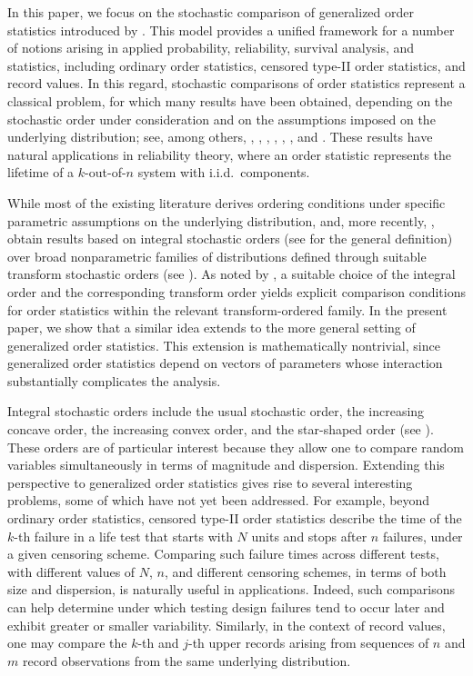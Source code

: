 \documentclass [11pt]{article}
\begin{document}
In this paper, we focus on the stochastic comparison of generalized order statistics introduced by \cite{Kamps1995}. This model provides a unified framework for a number of notions arising in applied probability, reliability, survival analysis, and statistics, including ordinary order statistics, censored type-II order statistics, and record values.
In this regard, stochastic comparisons of order statistics represent a classical problem, for which many results have been obtained, depending on the stochastic order under consideration and on the assumptions imposed on the underlying distribution; see, among others, \cite{ALO-JAP}, \cite{arnold1991exp}, \cite{kochar2006, kochar2012}, \cite{kochar2009}, \cite{kundu2016}, \cite{lando2021st}, and \cite{wilfling1996c}. These results have natural applications in reliability theory, where an order statistic represents the lifetime of a $k$-out-of-$n$ system with i.i.d.\ components.

While most of the existing literature derives ordering conditions under specific parametric assumptions on the underlying distribution, \cite{lando2021st} and, more recently, \cite{ALO-JAP}, obtain results based on integral stochastic orders (see \cite{muller1997} for the general definition) over broad nonparametric families of distributions defined through suitable transform stochastic orders (see \cite{shaked2007}). As noted by \cite{ALO-JAP}, a suitable choice of the integral order and the corresponding transform order yields explicit comparison conditions for order statistics within the relevant transform-ordered family. In the present paper, we show that a similar idea extends to the more general setting of generalized order statistics. This extension is mathematically nontrivial, since generalized order statistics depend on vectors of parameters whose interaction substantially complicates the analysis.

Integral stochastic orders include the usual stochastic order, the increasing concave order, the increasing convex order, and the star-shaped order (see \cite{shaked2007}). These orders are of particular interest because they allow one to compare random variables simultaneously in terms of magnitude and dispersion. Extending this perspective to generalized order statistics gives rise to several interesting problems, some of which have not yet been addressed. For example, beyond ordinary order statistics, censored type-II order statistics describe the time of the $k$-th failure in a life test that starts with $N$ units and stops after $n$ failures, under a given censoring scheme. Comparing such failure times across different tests, with different values of $N$, $n$, and different censoring schemes, in terms of both size and dispersion, {is naturally} useful in applications. Indeed, such comparisons can help determine under which testing design failures tend to occur later and exhibit greater or smaller variability. Similarly, in the context of record values, one may compare the $k$-th and $j$-th upper records arising from sequences of $n$ and $m$ record observations from the same underlying distribution.
\end{document}
